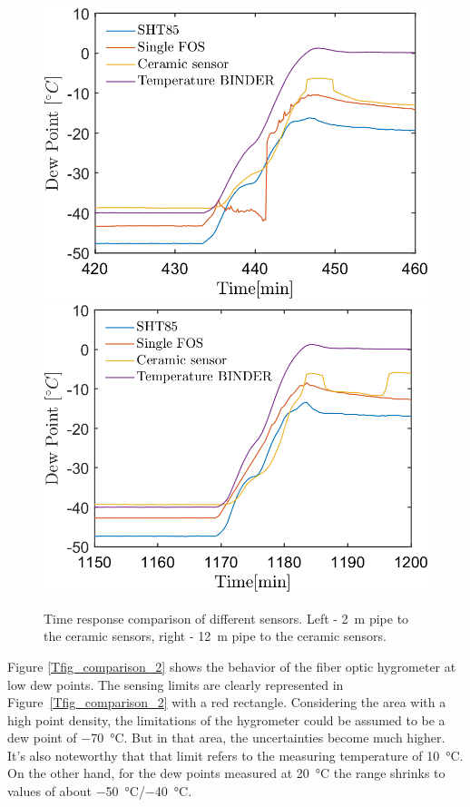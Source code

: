\begin{figure}[!h]
\centering
\includegraphics[width=0.47\columnwidth]{Chapter5/images/DPCPercent_response2m.png}
\includegraphics[width=0.47\columnwidth]{Chapter5/images/DPCPercent_response12m.png}
\caption{Time response comparison of different sensors. Left - \SI{2}{\metre} pipe to the ceramic sensors, right - \SI{12}{\metre} pipe to the ceramic sensors.}
\label{fig_comparison_hw}
\end{figure}
\newpage
Figure \ref{Tfig_comparison_2} shows the behavior of the fiber optic hygrometer at low dew points. The sensing limits are clearly represented in Figure~\ref{Tfig_comparison_2} with a red rectangle. Considering the area with a high point density, the limitations of the hygrometer could be assumed to be a dew point of \SI{-70}{\celsius}. But in that area, the uncertainties become much higher. It's also noteworthy that that limit refers to the measuring temperature of \SI{10}{\celsius}. On the other hand, for the dew points measured at \SI{20}{\celsius} the range shrinks to values of about \SI{-50}{\celsius}/\SI{-40}{\celsius}.

